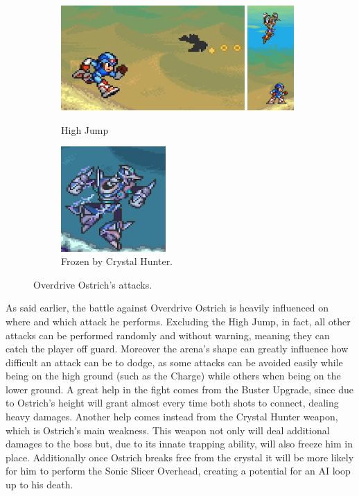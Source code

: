 \begin{figure}
	\ContinuedFloat
	\centering
	\begin{subfigure}{\linewidth}
		\centering
		\includegraphics[height=4cm]{figures/X2/Overdrive_ostrich/Ostrich_background_2.png}
		\includegraphics[height=4cm]{figures/X2/Overdrive_ostrich/Ostrich_background.png}
		\caption{High Jump}
	\end{subfigure}
	\begin{subfigure}{0.4\linewidth}
		\centering
		\includegraphics[height= 4cm]{figures/X2/Overdrive_ostrich/Ostrich_freeze.png}
		\caption{Frozen by Crystal Hunter.}
	\end{subfigure}
	\caption{Overdrive Ostrich's attacks.}	
\end{figure}
As said earlier, the battle against Overdrive Ostrich is heavily influenced on where and which attack he performs. Excluding the High Jump, in fact, all other attacks can be performed randomly and without warning, meaning they can catch the player off guard. Moreover the arena's shape can greatly influence how difficult an attack can be to dodge, as some attacks can be avoided easily while being on the high ground (such as the Charge) while others when being on the lower ground. A great help in the fight comes from the Buster Upgrade, since due to Ostrich's height will grant almost every time both shots to connect, dealing heavy damages. Another help comes instead from the Crystal Hunter weapon, which is Ostrich's main weakness. This weapon not only will deal additional damages to the boss but, due to its innate trapping ability, will also freeze him in place. Additionally once Ostrich breaks free from the crystal it will be more likely for him to perform the Sonic Slicer Overhead, creating a potential for an AI loop up to his death.

